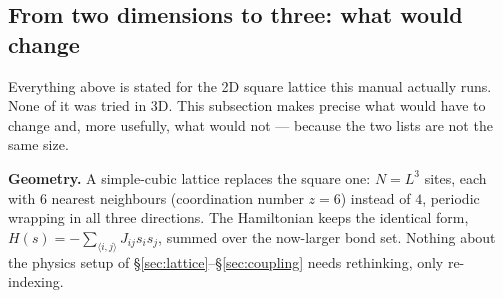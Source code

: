 \documentclass[11pt,a4paper]{article}
\begin{document}
\subsection{From two dimensions to three: what would change}\label{sec:threed}
Everything above is stated for the 2D square lattice this manual actually runs. None of it was
tried in 3D. This subsection makes precise what would have to change and, more usefully, what
would not --- because the two lists are not the same size.

\textbf{Geometry.} A simple-cubic lattice replaces the square one: $N=L^3$ sites, each with $6$
nearest neighbours (coordination number $z=6$) instead of $4$, periodic wrapping in all three
directions. The Hamiltonian keeps the identical form,
$H(s)=-\sum_{\langle i,j\rangle}J_{ij}s_is_j$, summed over the now-larger bond set. Nothing about
the physics setup of \S\ref{sec:lattice}--\S\ref{sec:coupling} needs rethinking, only re-indexing.
\end{document}
